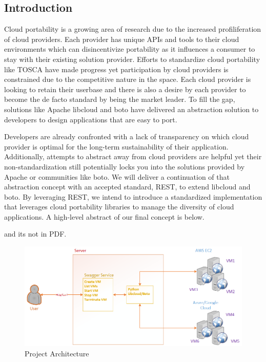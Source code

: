 \subsection{Introduction}\label{introduction}

Cloud portability is a growing area of research due to the increased
profiliferation of cloud providers. Each provider has unique APIs and
tools to their cloud environments which can disincentivize portability
as it influences a consumer to stay with their existing solution
provider. Efforts to standardize cloud portability like TOSCA have made
progress yet participation by cloud providers is constrained due to the
competitive nature in the space. Each cloud provider is looking to
retain their userbase and there is also a desire by each provider to
become the de facto standard by being the market leader. To fill the
gap, solutions like Apache libcloud and boto have delivered an
abstraction solution to developers to design applications that are easy
to port.

Developers are already confronted with a lack of transparency on which
cloud provider is optimal for the long-term sustainability of their
application. Additionally, attempts to abstract away from cloud
providers are helpful yet their non-standardization still potentially
locks you into the solutions provided by Apache or communities like
boto. We will deliver a continuation of that abstraction concept with an
accepted standard, REST, to extend libcloud and boto. By leveraging
REST, we intend to introduce a standardized implementation that
leverages cloud portability libraries to manage the diversity of cloud
applications. A high-level abstract of our final concept is below.

 and its not in PDF.

\begin{figure}[!ht]
  \centering\includegraphics[width=\columnwidth]{images/proj-arch.png}
  \caption{Project Architecture}\label{F:arch}
\end{figure}


